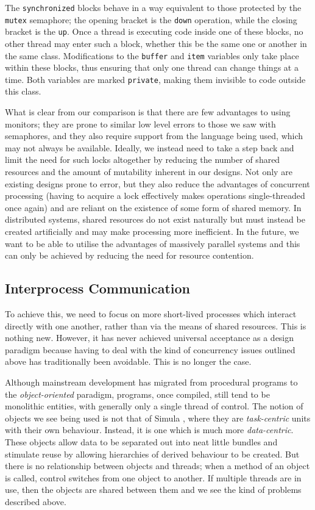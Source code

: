 The \texttt{synchronized} blocks behave in a way equivalent to those
protected by the \texttt{mutex} semaphore; the opening bracket is the
\texttt{down} operation, while the closing bracket is the \texttt{up}.
Once a thread is executing code inside one of these blocks, no other
thread may enter such a block, whether this be the same one or another
in the same class.  Modifications to the \texttt{buffer} and
\texttt{item} variables only take place within these blocks, thus
ensuring that only one thread can change things at a time.  Both
variables are marked \texttt{private}, making them invisible to code
outside this class.

What is clear from our comparison is that there are few advantages to
using monitors; they are prone to similar low level errors to those we
saw with semaphores, and they also require support from the language
being used, which may not always be available.  Ideally, we instead
need to take a step back and limit the need for such locks altogether
by reducing the number of shared resources and the amount of
mutability inherent in our designs.  Not only are existing designs
prone to error, but they also reduce the advantages of concurrent
processing (having to acquire a lock effectively makes operations
single-threaded once again) and are reliant on the existence of some
form of shared memory.  In distributed systems, shared resources do
not exist naturally but must instead be created artificially and may
make processing more inefficient.  In the future, we want to be able
to utilise the advantages of massively parallel systems and this can
only be achieved by reducing the need for resource contention.

\subsection{Interprocess Communication}
\label{ipc}

To achieve this, we need to focus on more short-lived processes which
interact directly with one another, rather than via the means of
shared resources.  This is nothing new.  However, it has never
achieved universal acceptance as a design paradigm because having to
deal with the kind of concurrency issues outlined above has
traditionally been avoidable.  This is no longer the case.

Although mainstream development has migrated from procedural programs
to the \emph{object-oriented} paradigm, programs, once compiled, still
tend to be monolithic entities, with generally only a single thread of
control.  The notion of objects we see being used is not that of
Simula \cite{simula}, where they are \emph{task-centric} units with
their own behaviour.  Instead, it is one which is much more
\emph{data-centric}.  These objects allow data to be separated out
into neat little bundles and stimulate reuse by allowing hierarchies
of derived behaviour to be created.  But there is no relationship
between objects and threads; when a method of an object is called,
control switches from one object to another.  If multiple threads are
in use, then the objects are shared between them and we see the kind
of problems described above.

